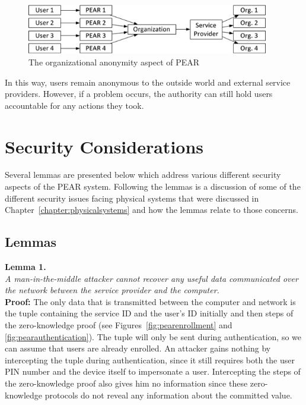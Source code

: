 \begin{figure}[!ht]
\centering
\includegraphics[width=400px]{images/pearorgnaizational.jpg}
\caption{The organizational anonymity aspect of PEAR}
\label{fig:pearorganizational}
\end{figure}
\FloatBarrier

In this way, users remain anonymous to the outside world and external service providers. However, if a problem occurs,
the authority can still hold users accountable for any actions they took.

\section{Security Considerations}
Several lemmas are presented below which address various different security aspects of the PEAR system.
Following the lemmas is a discussion of some of the different security issues facing physical systems that
were discussed in Chapter~\ref{chapter:physicalsystems} and how the lemmas relate to those concerns.

\subsection{Lemmas}
\noindent \textbf{Lemma 1.} \\
\noindent \emph{A man-in-the-middle attacker cannot recover any useful data communicated over the network between the
service provider and the computer.} \\
{\bf Proof:}  The only data that is transmitted between the computer and network is the tuple containing the service
ID and the user's ID initially and then steps of the zero-knowledge proof (see Figures~\ref{fig:pearenrollment} and
\ref{fig:pearauthentication}). The tuple will only be sent during authentication, so we can assume that users are already enrolled.
An attacker gains nothing by intercepting the tuple during authentication, since it still requires both the user PIN
number and the device itself to impersonate a user. Intercepting the steps of the zero-knowledge proof also gives him
no information since these zero-knowledge protocols do not reveal any information about the committed value.

